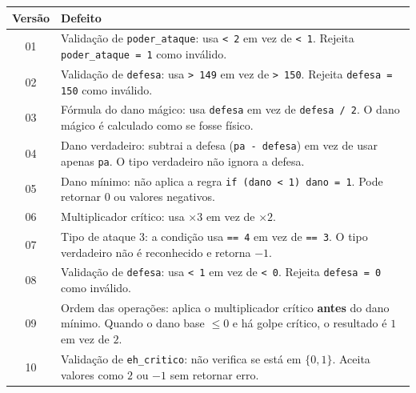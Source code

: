 \documentclass[12pt,a4paper]{article}
\begin{document}
\begin{tcolorbox}[colback=red!5, colframe=red!40, title=\textbf{Descrição dos Defeitos}, fonttitle=\small]
\small

\begin{center}
\begin{tabular}{cp{12cm}}
\toprule
\textbf{Versão} & \textbf{Defeito} \\
\midrule
01 & Validação de \texttt{poder\_ataque}: usa \texttt{< 2} em vez de \texttt{< 1}. Rejeita \texttt{poder\_ataque = 1} como inválido. \\
02 & Validação de \texttt{defesa}: usa \texttt{> 149} em vez de \texttt{> 150}. Rejeita \texttt{defesa = 150} como inválido. \\
03 & Fórmula do dano mágico: usa \texttt{defesa} em vez de \texttt{defesa / 2}. O dano mágico é calculado como se fosse físico. \\
04 & Dano verdadeiro: subtrai a defesa (\texttt{pa - defesa}) em vez de usar apenas \texttt{pa}. O tipo verdadeiro não ignora a defesa. \\
05 & Dano mínimo: não aplica a regra \texttt{if (dano < 1) dano = 1}. Pode retornar 0 ou valores negativos. \\
06 & Multiplicador crítico: usa $\times 3$ em vez de $\times 2$. \\
07 & Tipo de ataque 3: a condição usa \texttt{== 4} em vez de \texttt{== 3}. O tipo verdadeiro não é reconhecido e retorna $-1$. \\
08 & Validação de \texttt{defesa}: usa \texttt{< 1} em vez de \texttt{< 0}. Rejeita \texttt{defesa = 0} como inválido. \\
09 & Ordem das operações: aplica o multiplicador crítico \textbf{antes} do dano mínimo. Quando o dano base $\leq 0$ e há golpe crítico, o resultado é $1$ em vez de $2$. \\
10 & Validação de \texttt{eh\_critico}: não verifica se está em $\{0, 1\}$. Aceita valores como $2$ ou $-1$ sem retornar erro. \\
\bottomrule
\end{tabular}
\end{center}

\end{tcolorbox}
\end{document}
